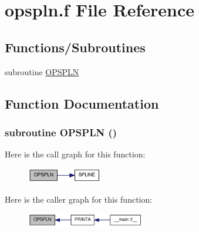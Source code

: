 \hypertarget{opspln_8f}{
\section{opspln.f File Reference}
\label{opspln_8f}
}
\subsection*{Functions/Subroutines}
\begin{DoxyCompactItemize}
\item 
subroutine \hyperlink{opspln_8f_af413b56b392ffd1937a3f1d8f90a22fc}{OPSPLN}
\end{DoxyCompactItemize}


\subsection{Function Documentation}
\hypertarget{opspln_8f_af413b56b392ffd1937a3f1d8f90a22fc}{
\subsubsection[{OPSPLN}]{\setlength{\rightskip}{0pt plus 5cm}subroutine OPSPLN ()}}
\label{opspln_8f_af413b56b392ffd1937a3f1d8f90a22fc}


Here is the call graph for this function:\nopagebreak
\begin{figure}[H]
\begin{center}
\leavevmode
\includegraphics[width=93pt]{opspln_8f_af413b56b392ffd1937a3f1d8f90a22fc_cgraph}
\end{center}
\end{figure}


Here is the caller graph for this function:\nopagebreak
\begin{figure}[H]
\begin{center}
\leavevmode
\includegraphics[width=146pt]{opspln_8f_af413b56b392ffd1937a3f1d8f90a22fc_icgraph}
\end{center}
\end{figure}
